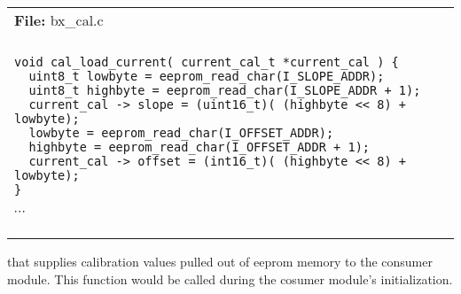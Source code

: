 \begin{center}
  \vspace{-\baselineskip}
  \begin{tabular}{|l|} \hline
    \rowcolor[gray]{0.8}
    \begin{minipage}[c]{\textwidth - 2\tabcolsep}
      \textbf{File:}
      bx\_cal.c
    \end{minipage}\\
    \begin{minipage}[c]{\textwidth - 2\tabcolsep}
      \vspace{0.5\baselineskip}
      $\cdots$ \\
      \begin{minipage}[c]{\textwidth - 2\tabcolsep}
        \lstset{language=c}
        \begin{lstlisting}
void cal_load_current( current_cal_t *current_cal ) {
  uint8_t lowbyte = eeprom_read_char(I_SLOPE_ADDR);
  uint8_t highbyte = eeprom_read_char(I_SLOPE_ADDR + 1);
  current_cal -> slope = (uint16_t)( (highbyte << 8) + lowbyte);
  lowbyte = eeprom_read_char(I_OFFSET_ADDR);
  highbyte = eeprom_read_char(I_OFFSET_ADDR + 1);
  current_cal -> offset = (int16_t)( (highbyte << 8) + lowbyte);
}
        \end{lstlisting}
      \end{minipage}
      $\cdots$\\
      \vspace{-0.5\baselineskip}
    \end{minipage}\\
    \hline
  \end{tabular}
\end{center}
that supplies calibration values pulled out of eeprom memory to the
consumer module.  This function would be called during the cosumer
module's initialization.


